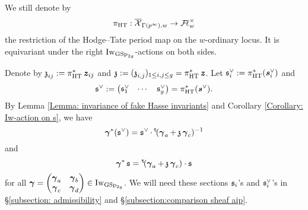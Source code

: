 We still denote by
$$\pi_{\HT}:\overline{\calX}_{\Gamma(p^{\infty}), w}\rightarrow \adicFL_{w}^\times$$
the restriction of the Hodge--Tate period map on the $w$-ordinary locus. It is equivariant under the right $\Iw_{\GSp_{2g}}$-actions on both sides.

Denote by $\frakz_{ij}:=\pi_{\HT}^*\bfitz_{ij}$ and $\frakz:=(\frakz_{i,j})_{1\leq i,j\leq g}=\pi_{\HT}^*\bfitz$. Let $\fraks_i^{\vee}:=\pi_{\HT}^*(\bfits_i^{\vee})$ and $$\fraks^{\vee}:=\begin{pmatrix}\fraks_1^{\vee} &  \cdots &  \fraks_g^{\vee}\end{pmatrix}=\pi_{\HT}^*(\bfits^{\vee}).$$
By Lemma \ref{Lemma: invariance of fake Hasse invariants} and Corollary \ref{Corollary: Iw-action on s}, we have
$$\bfgamma^*(\fraks^{\vee})  = \fraks^{\vee} \cdot \trans(\bfgamma_a + \frakz\bfgamma_c)^{-1}$$ 
and 
\begin{equation}\label{eq: action on fake Hasse invariants}
    \bfgamma^*\fraks =  \trans(\bfgamma_a + \frakz\bfgamma_c)\cdot \fraks
\end{equation}
for all $\bfgamma=\begin{pmatrix}\bfgamma_a &\bfgamma_b\\ \bfgamma_c & \bfgamma_d\end{pmatrix}\in \Iw_{\GSp_{2g}}$. We will need these sections $\fraks_i$'s and $\fraks_i^{\vee}$'s in \S \ref{subsection: admissibility} and \S \ref{subsection:comparison sheaf aip}.